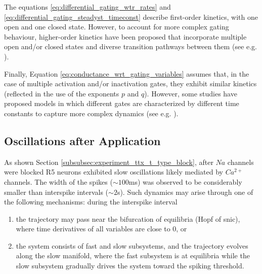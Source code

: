 \documentclass[../main.tex]{subfiles}
\begin{document}
The equations \ref{eq:differential_gating_wtr_rates} and \ref{eq:differential_gating_steadyst_timeconst} describe first-order kinetics, with one open and one
closed state. However, to account for more complex gating behaviour, higher-order kinetics have been proposed that incorporate multiple open and/or closed states and diverse transition pathways
between them (see e.g. \parencite{wangModelTtypeCalcium1991,brunoUsingIndependentOpentoclosed2005}).

Finally, Equation \ref{eq:conductance_wrt_gating_variables} assumes that, in the case of multiple activation and/or inactivation gates, they exhibit similar kinetics (reflected in the use of the exponents $p$ and $q$). However, some studies have proposed models in which different gates are characterized by different time constants to capture more complex dynamics (see e.g. \parencite{destexheModelInwardCurrent1993}).


\subsection{Oscillations after  Application} \label{subsec:math_backg_ttx_oscillations}

As shown Section \ref{subsubsec:experiment_ttx_t_type_block}, after $Na$ channels were blocked
R5 neurons exhibited slow oscillations likely mediated by $Ca^{2+}$ channels. The width of the spikes ($\sim 100$ms) was observed to be considerably smaller than interspike intervals ($\sim 2$s).
Such dynamics may arise through one of the following mechanisms: during the interspike interval
\begin{enumerate}
    \item the trajectory may pass near the bifurcation of equilibria (Hopf of \gls{snic}), where time derivatives of all variables are close to $0$, or
    \item the system consists of fast and slow subsystems, and the trajectory evolves along the slow manifold, where the fast subsystem is at equilibria while the slow subsystem gradually drives the system toward the spiking threshold.
\end{enumerate}
\end{document}

